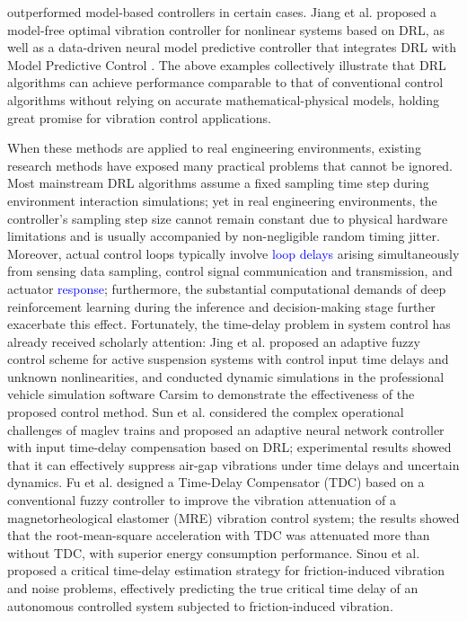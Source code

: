 \documentclass[review]{elsarticle}
\begin{document}
outperformed model-based controllers in certain cases. Jiang et al. \citep{jiang_Model-free_2025} proposed a model-free optimal vibration controller for nonlinear systems based on DRL, as well as a data-driven neural model predictive controller that integrates DRL with Model Predictive Control \citep{jiang_Datadriven_2025}. The above examples collectively illustrate that DRL algorithms can achieve performance comparable to that of conventional control algorithms without relying on accurate mathematical-physical models, holding great promise for vibration control applications.

When these methods are applied to real engineering environments, existing research methods have exposed many practical problems that cannot be ignored.
Most mainstream DRL algorithms assume a fixed sampling time step during environment interaction simulations; yet in real engineering environments, the controller's sampling step size cannot remain constant due to physical hardware limitations and is usually accompanied by non-negligible random timing jitter.
Moreover, actual control loops typically involve \textcolor{blue}{loop delays} arising simultaneously from sensing data sampling, control signal communication and transmission, and actuator \textcolor{blue}{response}; furthermore, the substantial computational demands of deep reinforcement learning during the inference and decision-making stage further exacerbate this effect.
Fortunately, the time-delay problem in system control has already received scholarly attention: Jing et al.
\citep{na_Adaptive_2019} proposed an adaptive fuzzy control scheme for active suspension systems with control input time delays and unknown nonlinearities, and conducted dynamic simulations in the professional vehicle simulation software Carsim to demonstrate the effectiveness of the proposed control method.
Sun et al.
\citep{sun_Reinforcement_2022} considered the complex operational challenges of maglev trains and proposed an adaptive neural network controller with input time-delay compensation based on DRL; experimental results showed that it can effectively suppress air-gap vibrations under time delays and uncertain dynamics.
Fu et al.
\citep{fu_Time_2019} designed a Time-Delay Compensator (TDC) based on a conventional fuzzy controller to improve the vibration attenuation of a magnetorheological elastomer (MRE) vibration control system; the results showed that the root-mean-square acceleration with TDC was attenuated more than without TDC, with superior energy consumption performance.
Sinou et al.
\citep{sinou_active_2021} proposed a critical time-delay estimation strategy for friction-induced vibration and noise problems, effectively predicting the true critical time delay of an autonomous controlled system subjected to friction-induced vibration.
\end{document}
